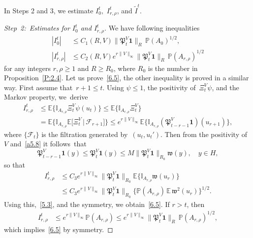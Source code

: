 \documentclass[AHL,Unicode,longabstracts]{cedram}
\newcommand{\pP}{{\mathbb P}}
\newcommand{\I}{{\mathbb I}}
\newcommand{\E}{{\mathbb E}}
\newcommand{\FF}{{\mathcal F}}
\newcommand{\wwww}{{\mathfrak w}}
\newcommand{\PPPP}{{\mathfrak P}}
\newenvironment{step}{\begin{proof}}{\let\qed\relax \end{proof}}
\begin{document}
In Steps 2 and 3, we estimate $I_{0}^t,$ $I_{r,\rho}^t$, and $\tilde I^{t}$.

\begin{step}[Step~2:~Estimates for $I_{0}^t$ and $I_{r,\rho}^t$]
We have following inequalities
\begin{align}
|I_{0}^t|&\le C_1(R,V)\|\PPPP_t^V{\mathbf1}\|_R\,\pP(A_{0})^{1/2}, \label{6.5aaa}
\\
|I_{r,\rho}^t|&\le C_2(R,V)e^{r\|V\|_\infty}\|\PPPP_t^V{\mathbf1}\|_R\,\pP(A_{r,\rho})^{1/2} \label{6.5}
\end{align}
for any integers $r,\rho\ge1$ and $R\ge R_0$, where $R_0$ is the number in Proposition~\ref{P:2.4}. Let us prove~\eqref{6.5}, the other inequality is proved in a similar way. First assume that~$r+1\le t$. Using $ \psi \le 1$, the positivity of~$\Xi^V_t\psi $, and the Markov property, we~derive
\begin{align*}
I_{r,\rho}^t &\le\E\bigl\{\I_{A_{r,\rho}}\Xi^V_t\psi(u_t)\bigr\}
\le \E\bigl\{\I_{A_{r,\rho}}\Xi^V_t\bigr\}\\
&= \E\bigl\{\I_{A_{r,\rho}}\E\bigl[\Xi^V_t\,\big|\,\FF_{r+1}\bigr]\bigr\}
\le e^{r\|V\|_\infty}\E\bigl\{\I_{A_{r,\rho}}(\PPPP_{t-r-1}^V{\mathbf1})(u_{r+1})\bigr\},
\end{align*}
where $\{\FF_t\}$ is the filtration generated by~$(u_t,u_t')$. Then from the positivity of~$V$ and~\eqref{a5.8} it follows~that
\[
\PPPP_{t-r-1}^{V}{\mathbf1}(y)\le \PPPP_{t}^{V}{\mathbf1}(y)\le M\|\PPPP_{t}^{V}{\mathbf1}\|_{R_0}\wwww (y),\quad y\in H,
\]
so that
\begin{align*}
I_{r,\rho}^t &\le C_3 e^{r\|V\|_\infty}\|\PPPP_{t}^V{\mathbf1}\|_{R_0}\E\bigl\{\I_{A_{r,\rho}}\wwww (u_r)\bigr\}\\
&\le C_3 e^{r\|V\|_\infty}\|\PPPP_{t}^V{\mathbf1}\|_{R_0}\bigl\{\pP(A_{r,\rho})\,\E\,\wwww ^2(u_r)\bigr\}^{1/2}.
\end{align*}
Using this,~\eqref{5.3}, and the symmetry, we obtain~\eqref{6.5}. If $r> t$, then
\begin{align*}
I_{r,\rho}^t &
\le e^{r\|V\|_\infty}\pP(A_{r,\rho})\le e^{r\|V\|_\infty} \|\PPPP_t^V{\mathbf1}\|_R\,\pP(A_{r,\rho})^{1/2},
\end{align*}
which implies~\eqref{6.5} by symmetry.
\end{step}
\end{document}
